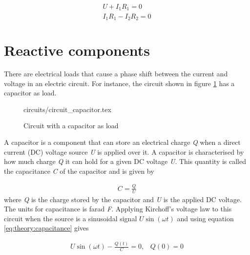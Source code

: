 \documentclass[class=book, crop=false]{standalone}
\begin{document}
\begin{equation}
   \begin{aligned}\label{eq:theory:krirchoffs_2nd_ex}
    U + I_{1}R_{1} = 0 
    \\
    I_{1}R_{1} - I_{2}R_{2} = 0
\end{aligned} 
\end{equation}

\section{Reactive components}
There are electrical loads that cause a phase shift between the current and voltage in an electric circuit. For instance, the circuit shown in figure \ref{fig:theory:circuit_capacitor} has a capacitor as load.


\begin{figure}[ht!]
    \center
    {circuits/circuit_capacitor.tex}
    \caption[size = 9]
    {Circuit with a capacitor as load}\label{fig:theory:circuit_capacitor}
\end{figure}



A capacitor is a component that can store an electrical charge \textit{Q} when a direct current (DC) voltage source \textit{U} is applied over it. A capacitor is characterised by how much charge \textit{Q} it can hold for a given DC voltage \textit{U}. This quantity is called the capacitance \textit{C} of the capacitor and is given by 

\begin{equation}
   \begin{aligned}\label{eq:theory:capacitance}
C = \frac{Q}{U}
\end{aligned} 
\end{equation}
where \textit{Q} is the charge stored by the capacitor and \textit{U} is the applied DC voltage. The units for capacitance is farad \textit{F}. Applying Kirchoff's voltage law to this circuit when the source is a sinusoidal signal $U\sin(\omega t)$ and using equation \eqref{eq:theory:capacitance} gives



\begin{equation}
   \begin{aligned}\label{eq:theory:capacitance_diffeq}
U\sin{(\omega t)} - \frac{Q(t)}{C} = 0, \;\;\; Q(0) = 0
\end{aligned} 
\end{equation}
\end{document}
